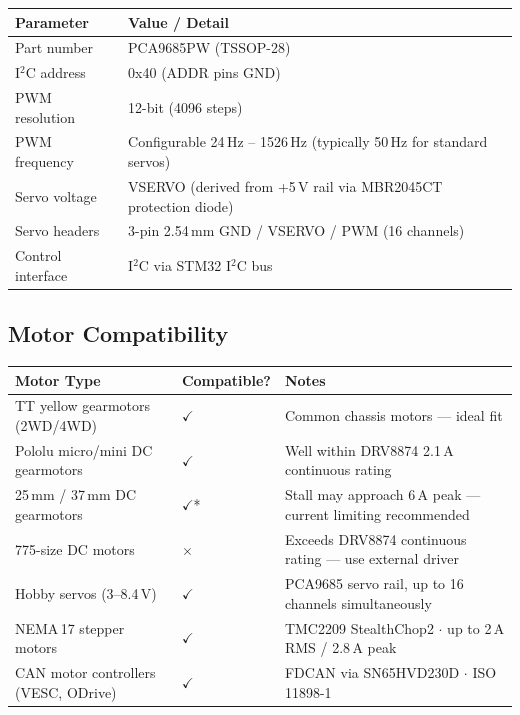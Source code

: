 \documentclass[11pt,a4paper]{article}
\begin{document}
\begin{longtable}{p{5cm} p{10cm}}
  \toprule
  \rowcolor{headergray}\color{white}\textbf{Parameter} & \color{white}\textbf{Value / Detail} \\
  \midrule\endhead
  Part number & PCA9685PW (TSSOP-28) \\
  I$^2$C address & 0x40 (ADDR pins \textrightarrow{} GND) \\
  PWM resolution & 12-bit (4096 steps) \\
  PWM frequency & Configurable 24\,Hz -- 1526\,Hz (typically 50\,Hz for standard servos) \\
  Servo voltage & VSERVO (derived from +5\,V rail via MBR2045CT protection diode) \\
  Servo headers & 3-pin 2.54\,mm GND / VSERVO / PWM (16 channels) \\
  Control interface & I$^2$C via STM32 I$^2$C bus \\
  \bottomrule
\end{longtable}

\subsection{Motor Compatibility}

\begin{longtable}{p{6cm} p{2cm} p{7cm}}
  \toprule
  \rowcolor{headergray}\color{white}\textbf{Motor Type} &
  \color{white}\textbf{Compatible?} &
  \color{white}\textbf{Notes} \\
  \midrule\endhead
  TT yellow gearmotors (2WD/4WD) & $\checkmark$ & Common chassis motors --- ideal fit \\
  Pololu micro/mini DC gearmotors & $\checkmark$ & Well within DRV8874 2.1\,A continuous rating \\
  25\,mm / 37\,mm DC gearmotors   & $\checkmark$* & Stall may approach 6\,A peak --- current limiting recommended \\
  775-size DC motors               & $\times$  & Exceeds DRV8874 continuous rating --- use external driver \\
  Hobby servos (3--8.4\,V)         & $\checkmark$ & PCA9685 servo rail, up to 16 channels simultaneously \\
  NEMA\,17 stepper motors          & $\checkmark$ & TMC2209 StealthChop2 $\cdot$ up to 2\,A RMS / 2.8\,A peak \\
  CAN motor controllers (VESC, ODrive) & $\checkmark$ & FDCAN via SN65HVD230D $\cdot$ ISO\,11898-1 \\
  \bottomrule
\end{longtable}
\end{document}
